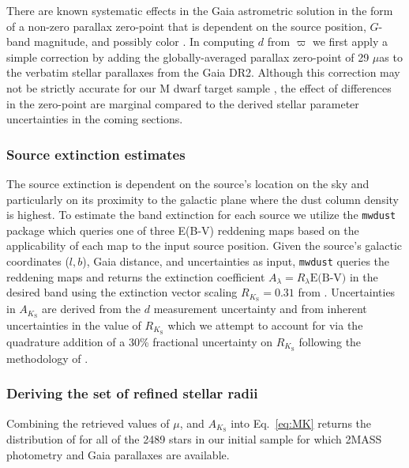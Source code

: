 There are known systematic effects in the Gaia astrometric solution in the form of a non-zero parallax zero-point
that is dependent on the source position, $G$-band magnitude, and possibly color \citep{lindegren18}.
In computing $d$ from $\varpi$ we first apply a simple correction by adding the globally-averaged parallax
zero-point of 29 $\mu$as \citep{lindegren18} to the verbatim stellar parallaxes from the Gaia DR2. Although this 
correction may not be strictly accurate for our M dwarf target sample \citep{leung19}, the effect of differences in 
the zero-point are marginal compared to the derived stellar parameter uncertainties in the coming sections.

\subsubsection{Source extinction estimates} \label{sect:AK}
The source extinction is dependent on the source's location on the sky and particularly on
its proximity to the galactic plane where the dust column density is highest. To estimate the \Ks{-}band extinction
for each source we utilize the \texttt{mwdust} package \citep{bovy16} which queries one of three E(B-V) reddening maps
\citep[i.e.][]{drimmel03,marshall06,green15} based on the applicability of each map to the input source position.
Given the source's galactic coordinates ($l,b$), Gaia distance, and uncertainties as input, \texttt{mwdust}
queries the reddening maps and returns the extinction coefficient $A_{\lambda}=R_{\lambda} \text{E(B-V)}$ in the desired
band using the extinction vector scaling $R_{K_{\text{S}}}=0.31$ from \cite{schlafly11}. Uncertainties in $A_{K_{\text{S}}}$ are
derived from the $d$ measurement uncertainty and from inherent uncertainties in the value of $R_{K_{\text{S}}}$
\citep[e.g.]{green18}
which we attempt to account for via the quadrature addition of a 30\% fractional uncertainty on $R_{K_{\text{S}}}$ following
the methodology of \citep{fulton18}.

\subsubsection{Deriving the set of refined stellar radii}
Combining the retrieved values of \Ks{,} $\mu$, and $A_{K_{\text{S}}}$ into Eq.~\ref{eq:MK} returns the
distribution of \MK{} for all of the 2489 stars in our initial sample for which 2MASS photometry and Gaia
parallaxes are available. \\

